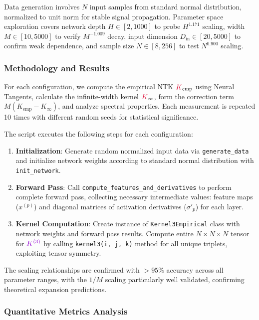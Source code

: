 \documentclass[a4paper]{article}
\theoremstyle{plain}
\theoremstyle{definition}
\theoremstyle{remark}
\begin{document}
Data generation involves $N$ input samples from standard normal distribution, normalized to unit norm for stable signal propagation. Parameter space exploration covers network depth $H \in [2, 1000]$ to probe $H^{1.171}$ scaling, width $M \in [10, 5000]$ to verify $M^{-1.009}$ decay, input dimension $D_{\text{in}} \in [20, 5000]$ to confirm weak dependence, and sample size $N \in [8, 256]$ to test $N^{0.900}$ scaling.

\subsubsection{Methodology and Results}

For each configuration, we compute the empirical NTK $\textcolor{kernelcolor}{K}_{\text{emp}}$ using Neural Tangents, calculate the infinite-width kernel $\textcolor{kernelcolor}{K}_{\infty}$, form the correction term $M(K_{\text{emp}} - K_{\infty})$, and analyze spectral properties. Each measurement is repeated 10 times with different random seeds for statistical significance.

The script executes the following steps for each configuration:
\begin{enumerate}
    \item \textbf{Initialization}: Generate random normalized input data via \texttt{generate\_data} and initialize network weights according to standard normal distribution with \texttt{init\_network}.
    \item \textbf{Forward Pass}: Call \texttt{compute\_features\_and\_derivatives} to perform complete forward pass, collecting necessary intermediate values: feature maps ($x^{(p)}$) and diagonal matrices of activation derivatives ($\sigma'_p$) for each layer.
    \item \textbf{Kernel Computation}: Create instance of \texttt{Kernel3Empirical} class with network weights and forward pass results. Compute entire $N \times N \times N$ tensor for $\textcolor{k3color}{K^{(3)}}$ by calling \texttt{kernel3(i, j, k)} method for all unique triplets, exploiting tensor symmetry.
\end{enumerate}

The scaling relationships are confirmed with $>95\%$ accuracy across all parameter ranges, with the $1/M$ scaling particularly well validated, confirming theoretical expansion predictions.

\subsubsection{Quantitative Metrics Analysis}
\end{document}
